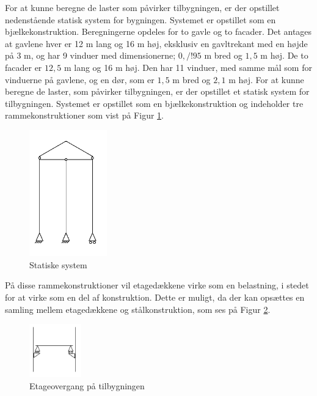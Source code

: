 For at kunne beregne de laster som påvirker tilbygningen, er der opstillet nedenstående statisk system for bygningen. Systemet er opstillet som en bjælkekonstruktion.
\newline
\newline
Beregningerne opdeles for to gavle og to facader. Det antages at gavlene hver er 12 m lang og 16 m høj, eksklusiv en gavltrekant med en højde på 3 m, og har 9 vinduer med dimensionerne; $0,/!95$ m bred og $1,\!5$ m høj.
\newline
\newline
De to facader er $12,\!5$ m lang og 16 m høj. Den har 11 vinduer, med samme mål som for vinduerne på gavlene, og en dør, som er $1,\!5$ m bred og $2,\!1$ m høj.
\newline
\newline
For at kunne beregne de laster, som påvirker tilbygningen, er der opstillet et statisk system for tilbygningen. Systemet er opstillet som en bjælkekonstruktion og indeholder tre rammekonstruktioner som vist på Figur \ref{fig:system}.

\begin{figure}[htbp]
	\centering
	\includegraphics[width=0.3\textwidth]{billeder/del1statiskesystem.png}
	\caption{Statiske system}
	\label{fig:system}
\end{figure}

På disse rammekonstruktioner vil etagedækkene virke som en belastning, i stedet for at virke som en del af konstruktion. Dette er muligt, da der kan opsættes en samling mellem etagedækkene og stålkonstruktion, som ses på Figur \ref{fig:etage}.

\begin{figure}[htbp]
	\centering
	\includegraphics[width=0.2\textwidth]{billeder/etageovergang.png}
	\caption{Etageovergang på tilbygningen}
	\label{fig:etage}
\end{figure}

